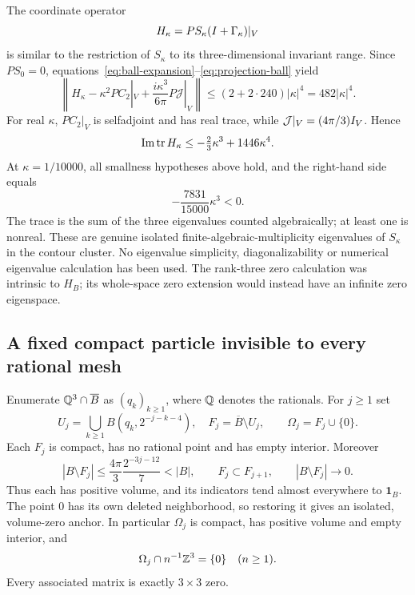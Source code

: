 \documentclass[11pt]{article}
\theoremstyle{remark}\newtheorem{remark}[theorem]{Remark}
\begin{document}
The coordinate operator
\[
 H_\kappa=P S_\kappa(I+\Gamma_\kappa)|_V
\]
is similar to the restriction of $S_\kappa$ to its three-dimensional invariant range. Since $PS_0=0$, equations~\eqref{eq:ball-expansion}--\eqref{eq:projection-ball} yield
\[
 \left\|H_\kappa-\kappa^2PC_2|_V
                 +\frac{i\kappa^3}{6\pi}P\mathcal J|_V\right\|
 \le (2+2\cdot240)|\kappa|^4=482|\kappa|^4.
\]
For real $\kappa$, $PC_2|_V$ is selfadjoint and has real trace, while $\mathcal J|_V=(4\pi/3)I_V$. Hence
\begin{equation}\label{eq:trace}
 \operatorname{Im}\operatorname{tr} H_\kappa\le-\tfrac23\kappa^3+1446\kappa^4.
\end{equation}
At $\kappa=1/10000$, all smallness hypotheses above hold, and the right-hand side equals
\[
 -\frac{7831}{15000}\kappa^3<0.
\]
The trace is the sum of the three eigenvalues counted algebraically; at least one is nonreal. These are genuine isolated finite-algebraic-multiplicity eigenvalues of $S_\kappa$ in the contour cluster. No eigenvalue simplicity, diagonalizability or numerical eigenvalue calculation has been used. The rank-three zero calculation was intrinsic to $H_B$; its whole-space zero extension would instead have an infinite zero eigenspace.

\subsection{A fixed compact particle invisible to every rational mesh}

Enumerate $\mathbb Q^3\cap\overline B$ as $(q_k)_{k\ge1}$, where $\mathbb Q$ denotes the rationals. For $j\ge1$ set
\[
 U_j=\bigcup_{k\ge1}B(q_k,2^{-j-k-4}),\quad
 F_j=\overline B\setminus U_j,\qquad \Omega_j=F_j\cup\{0\}.
\]
Each $F_j$ is compact, has no rational point and has empty interior. Moreover
\begin{equation}\label{eq:removed}
 |B\setminus F_j|\le\frac{4\pi}{3}\frac{2^{-3j-12}}7<|B|,
 \qquad F_j\subset F_{j+1},\qquad |B\setminus F_j|\to0.
\end{equation}
Thus each has positive volume, and its indicators tend almost everywhere to $\mathbf1_B$. The point $0$ has its own deleted neighborhood, so restoring it gives an isolated, volume-zero anchor. In particular $\Omega_j$ is compact, has positive volume and empty interior, and
\begin{equation}\label{eq:zero-matrix}
 \Omega_j\cap n^{-1}\mathbb Z^3=\{0\}\quad(n\ge1).
\end{equation}
Every associated matrix is exactly $3\times3$ zero.
\end{document}
